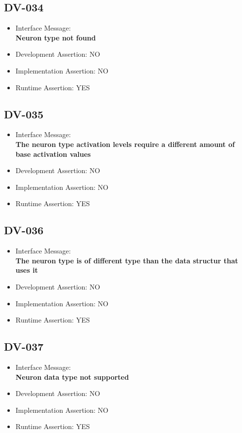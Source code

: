 \subsection{DV-034}
\begin{itemize}
  \item Interface Message:\\[1em]
    \textbf{Neuron type not found}
  \item Development Assertion: NO
  \item Implementation Assertion: NO
  \item Runtime Assertion: YES
\end{itemize}

\subsection{DV-035}
\begin{itemize}
  \item Interface Message:\\[1em]
    \textbf{The neuron type activation levels require a different amount of base activation values}
  \item Development Assertion: NO
  \item Implementation Assertion: NO
  \item Runtime Assertion: YES
\end{itemize}

\subsection{DV-036}
\begin{itemize}
  \item Interface Message:\\[1em]
    \textbf{The neuron type is of different type than the data structur that uses it}
  \item Development Assertion: NO
  \item Implementation Assertion: NO
  \item Runtime Assertion: YES
\end{itemize}

\subsection{DV-037}
\begin{itemize}
  \item Interface Message:\\[1em]
    \textbf{Neuron data type not supported}
  \item Development Assertion: NO
  \item Implementation Assertion: NO
  \item Runtime Assertion: YES
\end{itemize}

